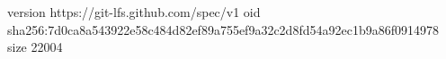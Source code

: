 version https://git-lfs.github.com/spec/v1
oid sha256:7d0ca8a543922e58c484d82ef89a755ef9a32c2d8fd54a92ec1b9a86f0914978
size 22004
